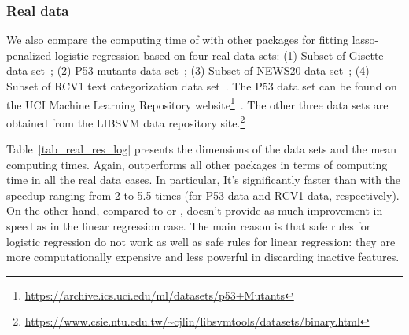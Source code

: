 \subsubsection{Real data}


We also compare the computing time of  with other packages for fitting lasso-penalized logistic regression based on four real data sets: (1) Subset of Gisette data set~\citep{guyon2005result}; (2) P53 mutants data set~\citep{danziger2009predicting}; (3) Subset of NEWS20 data set~\citep{keerthi2005modified}; (4) Subset of RCV1 text categorization data set~\citep{lewis2004rcv1}. The P53 data set can be found on the UCI Machine Learning Repository website\footnote{\url{https://archive.ics.uci.edu/ml/datasets/p53+Mutants}}~\citep{Lichman:2013}. The other three data sets are obtained from the LIBSVM data repository site.\footnote{\url{https://www.csie.ntu.edu.tw/~cjlin/libsvmtools/datasets/binary.html}}

Table~\ref{tab_real_res_log} presents the dimensions of the data sets and the mean computing times. Again,  outperforms all other packages in terms of computing time in all the real data cases. In particular, It's significantly faster than  with the speedup ranging from 2 to 5.5 times (for P53 data and RCV1 data, respectively). On the other hand, compared to  or ,  doesn't provide as much improvement in speed as in the linear regression case. The main reason is that safe rules for logistic regression do not work as well as safe rules for linear regression: they are more computationally expensive and less powerful in discarding inactive features.



